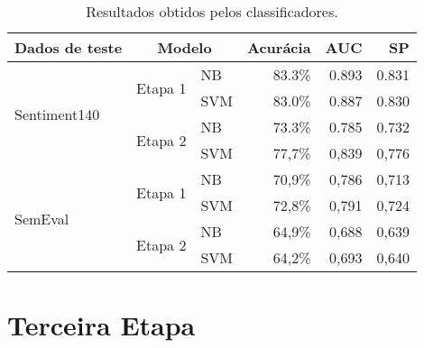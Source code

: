\begin{table}[h]
    \begin{center}
        \begin{tabular}{ |l|l|l|r|r|r| }
            \hline
            \textbf{Dados de teste} & \multicolumn{2}{|c|}{\textbf{Modelo}}  & \textbf{Acurácia} & \textbf{AUC} & \textbf{SP} \\ \hline
            \multirow{4}{*}{Sentiment140} & \multirow{2}{*}{Etapa 1} & NB  & 83.3\% & 0.893 & 0.831 \\ \cline{3-6}
                                          &                          & SVM & 83.0\% & 0.887 & 0.830 \\ \cline{2-6}
                                          & \multirow{2}{*}{Etapa 2} & NB  & 73.3\% & 0.785 & 0.732 \\ \cline{3-6}
                                          &                          & SVM & 77,7\% & 0,839 & 0,776 \\ \hline
            \multirow{4}{*}{SemEval}      & \multirow{2}{*}{Etapa 1} & NB  & 70,9\% & 0,786 & 0,713 \\ \cline{3-6}
                                          &                          & SVM & 72,8\% & 0,791 & 0,724 \\ \cline{2-6}
                                          & \multirow{2}{*}{Etapa 2} & NB  & 64,9\% & 0,688 & 0,639 \\ \cline{3-6}
                                          &                          & SVM & 64,2\% & 0,693 & 0,640 \\ \hline
        \end{tabular}
        \caption{Resultados obtidos pelos classificadores.}
        \label{tab:linear_perf}
    \end{center}
\end{table}

\section{Terceira Etapa}

